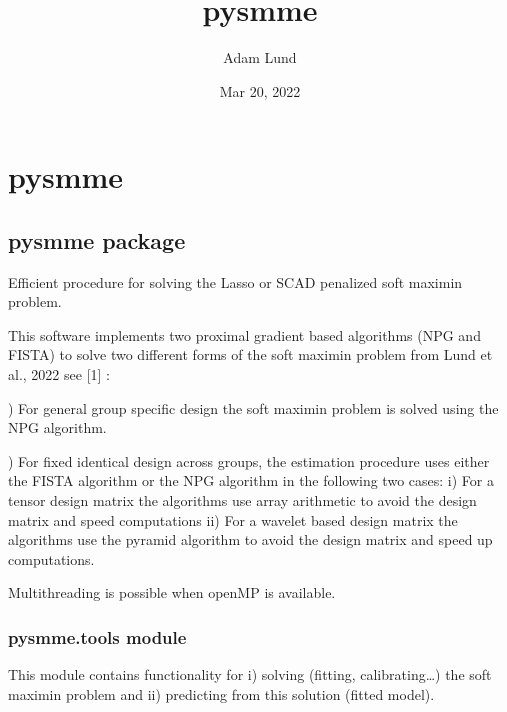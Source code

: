 \documentclass[letterpaper,10pt,english]{sphinxmanual}
\title{pysmme}
\date{Mar 20, 2022}
\author{Adam Lund}
\begin{document}
\pagestyle{empty}
\sphinxmaketitle
\pagestyle{plain}
\sphinxtableofcontents
\pagestyle{normal}
\label{\detokenize{index::doc}}



\chapter{pysmme}
\label{\detokenize{modules:pysmme}}\label{\detokenize{modules::doc}}

\section{pysmme package}
\label{\detokenize{pysmme:pysmme-package}}\label{\detokenize{pysmme::doc}}
\sphinxAtStartPar
Efficient procedure for solving the Lasso or SCAD penalized soft maximin problem.

\sphinxAtStartPar
This software implements two proximal
gradient based algorithms (NPG and FISTA) to solve two different forms of the soft
maximin problem from Lund et al., 2022 see {[}1{]} :

) For general group specific design the soft maximin problem is solved using the
NPG algorithm.

) For fixed identical design across groups, the estimation procedure uses
either the FISTA algorithm or the NPG algorithm in the following two cases:
i) For a tensor design matrix the algorithms use array arithmetic  to
avoid the design matrix and speed computations ii) For a wavelet based design
matrix the algorithms use the pyramid algorithm to avoid the design matrix and
speed up computations.

\sphinxAtStartPar
Multi\sphinxhyphen{}threading is possible when openMP is available.


\subsection{pysmme.tools module}
\label{\detokenize{pysmme:module-pysmme.tools}}\label{\detokenize{pysmme:pysmme-tools-module}}
\sphinxAtStartPar
This module contains functionality for i) solving (fitting, calibrating…) the soft 
maximin problem and ii) predicting from this solution (fitted model).
\end{document}
